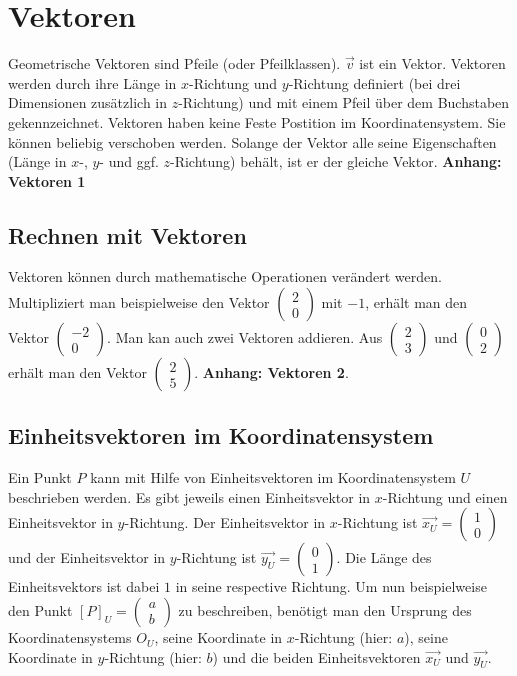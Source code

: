 \documentclass{article}
\newcommand{\m}[1]{\begin{pmatrix}#1\end{pmatrix}}
\begin{document}
    \section{Vektoren}

    Geometrische Vektoren sind Pfeile (oder Pfeilklassen). $\vec{v}$ ist ein Vektor.
    Vektoren werden durch ihre Länge in $x$-Richtung und $y$-Richtung definiert
    (bei drei Dimensionen zusätzlich in $z$-Richtung) und mit einem Pfeil über dem Buchstaben gekennzeichnet.
    Vektoren haben keine Feste Postition im Koordinatensystem. Sie können beliebig verschoben werden.
    Solange der Vektor alle seine Eigenschaften (Länge in $x$-, $y$- und ggf. $z$-Richtung) behält,
    ist er der gleiche Vektor. \textbf{Anhang: Vektoren 1}

    \subsection{Rechnen mit Vektoren}
    Vektoren können durch mathematische Operationen verändert werden. Multipliziert man beispielweise den Vektor $\m{2 \\ 0}$ mit $-1$,
    erhält man den Vektor $\m{-2 \\ 0}$. Man kan auch zwei Vektoren addieren. Aus $\m{2 \\ 3}$ und $\m{0 \\ 2}$ erhält man den
    Vektor $\m{2 \\ 5}$. \textbf{Anhang: Vektoren 2}.

    \subsection{Einheitsvektoren im Koordinatensystem}
    Ein Punkt $P$ kann mit Hilfe von Einheitsvektoren im Koordinatensystem $U$ beschrieben werden. Es gibt jeweils einen Einheitsvektor in
    $x$-Richtung und einen Einheitsvektor in $y$-Richtung. Der Einheitsvektor in $x$-Richtung ist $\vec{{x}_{U}} = \m{1 \\ 0}$ und der Einheitsvektor in
    $y$-Richtung ist $\vec{{y}_{U}} = \m{0 \\ 1}$. Die Länge des Einheitsvektors ist dabei $1$ in seine respective Richtung. Um nun beispielweise den Punkt
    ${[P]}_{U} = \m{a \\ b}$ zu beschreiben, benötigt man den Ursprung des Koordinatensystems ${O}_{U}$, seine Koordinate in $x$-Richtung (hier: $a$),
    seine Koordinate in $y$-Richtung (hier: $b$) und die beiden Einheitsvektoren $\vec{{x}_{U}}$ und $\vec{{y}_{U}}$.
    
\end{document}

